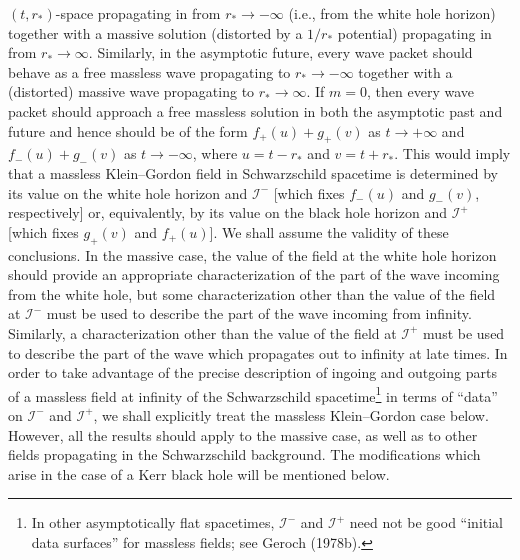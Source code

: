 \((t,r_*)\)-space propagating in from \(r_*\longrightarrow-\infty\) (i.e., from
the white hole horizon) together with a massive solution (distorted by a \(1/r_*\)
potential) propagating in from \(r_*\longrightarrow\infty\). Similarly, in the
asymptotic future, every wave packet should behave as a free massless wave
propagating to \(r_*\longrightarrow-\infty\) together with a (distorted) massive
wave propagating to \(r_*\longrightarrow\infty\). If \(m=0\), then every wave
packet should approach a free massless solution in both the asymptotic past and
future and hence should be of the form \(f_+(u)+g_+(v)\) as
\(t\longrightarrow+\infty\) and \(f_-(u)+g_-(v)\) as
\(t\longrightarrow-\infty\), where \(u=t-r_*\) and \(v=t+r_*\). This would
imply that a massless Klein--Gordon field in Schwarzschild spacetime is determined
by its value on the white hole horizon and \(\mathcal I^-\) [which fixes \(f_-(u)\)
and \(g_-(v)\), respectively] or, equivalently, by its value on the black hole horizon
and \(\mathcal I^+\) [which fixes \(g_+(v)\) and \(f_+(u)\)]. We shall assume the
validity of these conclusions. In the massive case, the value of the field at the white
hole horizon should provide an appropriate characterization of the part of the wave
incoming from the white hole, but some characterization other than the value of the
field at \(\mathcal I^-\) must be used to describe the part of the wave incoming from
infinity. Similarly, a characterization other than the value of the field at
\(\mathcal I^+\) must be used to describe the part of the wave which propagates out
to infinity at late times. In order to take advantage of the precise description of
ingoing and outgoing parts of a massless field at infinity of the Schwarzschild
spacetime\footnote{In other asymptotically flat spacetimes, \(\mathcal I^-\) and
\(\mathcal I^+\) need not be good ``initial data surfaces'' for massless fields; see
Geroch (1978b).} in terms of ``data'' on \(\mathcal I^-\) and \(\mathcal I^+\), we
shall explicitly treat the massless Klein--Gordon case below. However, all the results
should apply to the massive case, as well as to other fields propagating in the
Schwarzschild background. The modifications which arise in the case of a Kerr black
hole will be mentioned below.

